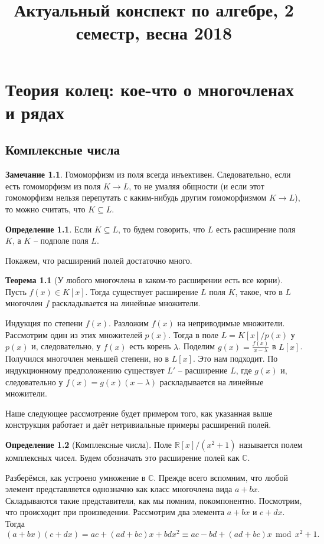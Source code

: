 \documentclass[10pt,a4paper,oneside]{book}
\theoremstyle{definition}
\newtheorem*{rem}{Замечание}
\newtheorem*{defn}{Определение}
\newtheorem{thm}{Теорема}
\renewcommand{\mod}{\,\operatorname{mod}\,}
\newcommand{\mb}[1]{\mathbb{#1}}
\def\thrm{\begin{thm}}
\def\ethrm{\end{thm}}
\def\dfn{\begin{defn}}
\def\edfn{\end{defn}}
\def\rm{\begin{rem}}
\def\erm{\end{rem}}
\begin{document}
\title{Актуальный конспект по алгебре, 2 семестр, весна 2018}
\date{}
\author{}
\maketitle
\tableofcontents

\setcounter{chapter}{1}

\chapter{Теория колец: кое-что о многочленах и рядах}

\section{Комплексные числа}
\rm Гомоморфизм из поля всегда инъективен. Следовательно, если есть гомоморфизм из поля $K\to L$, то не умаляя общности (и если этот гомоморфизм нельзя перепутать с каким-нибудь другим гомоморфизмом $K\to L$), то можно считать, что $K\subseteq L$.
\erm

\dfn Если $K\subseteq L$, то будем говорить, что $L$ есть расширение поля $K$, а $K$ -- подполе поля $L$.
\edfn
Покажем, что расширений полей достаточно много.
\thrm[У любого многочлена в каком-то расширении есть все корни] Пусть $f(x)\in K[x]$. Тогда существует расширение $L$ поля $K$, такое, что в $L$ многочлен $f$ раскладывается на линейные множители.
\ethrm
\proof Индукция по степени $f(x)$. Разложим $f(x)$ на неприводимые множители. Рассмотрим один из этих множителей $p(x)$. Тогда в поле $L=K[x]/p(x)$ у $p(x)$ и, следовательно, у $f(x)$ есть корень $\lambda$. Поделим $g(x)=\frac{f(x)}{x-\lambda}$ в $L[x]$. Получился многочлен меньшей степени, но в $L[x]$. Это нам подходит. По индукционному предположению существует $L'$ -- расширение $L$, где  $g(x)$ и, следовательно у $f(x)=g(x)(x-\lambda)$ раскладывается на линейные множители.
\endproof

Наше следующее рассмотрение будет примером того, как указанная выше конструкция работает и даёт нетривиальные примеры расширений полей.

\dfn[Комплексные числа] Поле $\mb R[x]/(x^2 + 1)$ называется полем комплексных чисел. Будем обозначать это расширение полей как $\mb C$.
\edfn

Разберёмся, как устроено умножение в $\mb C$. Прежде всего вспомним, что любой элемент представляется однозначно как класс многочлена вида $a+bx$. Складываются такие представители, как мы помним, покомпонентно. Посмотрим, что происходит при произведении. Рассмотрим два элемента $a+bx$ и $c+dx$. Тогда
$$(a+bx)(c+dx)=ac+(ad+bc)x+bdx^2\equiv ac-bd + (ad+bc)x \mod x^2+1.$$
\end{document}
